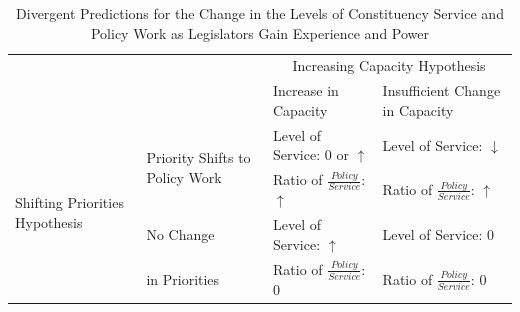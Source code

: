\documentclass[12pt]{article}
\begin{document}
\renewcommand{\arraystretch}{1.2}%

\begin{table}[h]

\caption{Divergent Predictions for the Change in the Levels of Constituency Service and Policy Work as Legislators Gain Experience and Power}\label{t:theory}

\begin{tabular}[t]{p{.12\linewidth}|p{.18\linewidth}|p{.25\linewidth}|p{.25\linewidth}|}

\multicolumn{2}{l}{\multirow{2}{*}{}} & \multicolumn{2}{c}{Increasing Capacity Hypothesis} \\ \cline{3-4}

\multicolumn{2}{l|}{}    &  Increase in Capacity  &   Insufficient Change in Capacity \\ \cline{2-4} 

\multirow{4}{2cm}{Shifting Priorities Hypothesis}  &   \multirow{2}{3cm}{Priority Shifts to Policy Work}   &  Level of Service: 0 or $\uparrow$  &  Level of Service: $\downarrow$  \\ 

& &  Ratio of $\frac{Policy}{Service}$: $\uparrow$   &   Ratio of $\frac{Policy}{Service}$: $\uparrow$  \\ \cline{2-4}

 &  No Change    &  Level of Service: $\uparrow$  & Level of Service: $0$ \\ 

 & in Priorities &   Ratio of $\frac{Policy}{Service}$: $0$  & Ratio of $\frac{Policy}{Service}$: $0$\\ \cline{2-4}

\end{tabular}

\end{table}


\renewcommand{\arraystretch}{1}%
\end{document}
